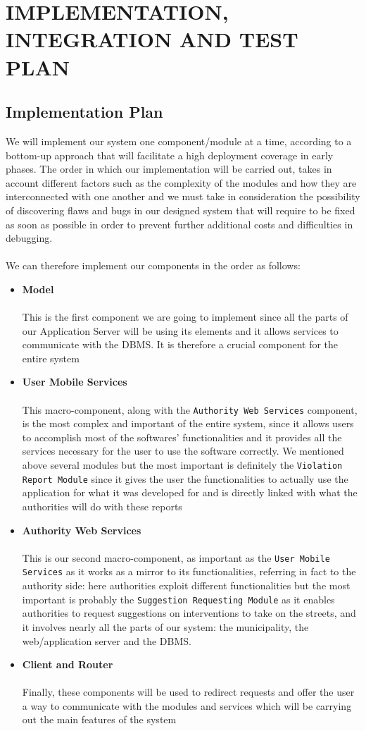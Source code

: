 \documentclass[12pt,a4paper]{article}
\begin{document}
\section{IMPLEMENTATION, INTEGRATION AND TEST PLAN}
\subsection{Implementation Plan}
We will implement our system one component/module at a time, according to a bottom-up approach that will facilitate a high deployment coverage in early phases. The order in which our implementation will be carried out, takes in account different factors such as the complexity of the modules and how they are interconnected with one another and we must take in consideration the possibility of discovering flaws and bugs in our designed system that will require to be fixed as soon as possible in order to prevent further additional costs and difficulties in debugging.\\\\
We can therefore implement our components in the order as follows:
\begin{itemize}
\item \textbf{Model}\\\\
This is the first component we are going to implement since all the parts of our Application Server will be using its elements and it allows services to communicate with the DBMS. It is therefore a crucial component for the entire system
\item \textbf{User Mobile Services}\\\\
This macro-component, along with the \texttt{Authority Web Services} component, is the most complex and important of the entire system, since it allows users to accomplish most of the softwares' functionalities and it provides all the services necessary for the user to use the software correctly. We mentioned above several modules but the most important is definitely the \texttt{Violation Report Module} since it gives the user the functionalities to actually use the application for what it was developed for and is directly linked with what the authorities will do with these reports
\item \textbf{Authority Web Services}\\\\
This is our second macro-component, as important as the \texttt{User Mobile Services} as it works as a mirror to its functionalities, referring in fact to the authority side: here authorities exploit different functionalities but the most important is probably the \texttt{Suggestion Requesting Module} as it enables authorities to request suggestions on interventions to take on the streets, and it involves nearly all the parts of our system: the municipality, the web/application server and the DBMS.
\item \textbf{Client and Router}\\\\
Finally, these components will be used to redirect requests and offer the user a way to communicate with the modules and services which will be carrying out the main features of the system
\end{itemize}
\end{document}

